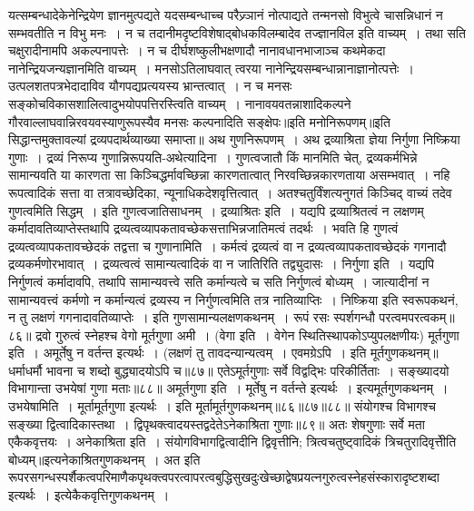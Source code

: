 यत्सम्बन्धादेकेनेन्द्रियेण ज्ञानमुत्पद्यते यदसम्बन्धाच्च परैज्र्ञानं नोत्पाद्यते तन्मनसो विभुत्वे चासन्निधानं न सम्भवतीति न विभु मनः~। न च तदानीमदृष्टविशेषाद्बोधकविलम्बादेव
तज्ज्ञानविल इति वाच्यम्~। तथा सति चक्षुरादीनामपि अकल्पनापत्तेः~। न च दीर्घशष्कुलीभक्षणादौ नानावधानभाजाञ्च कथमेकदा नानेन्द्रियजन्यज्ञानमिति वाच्यम्~।
मनसोऽतिलाघवात् त्वरया नानेन्द्रियसम्बन्धान्नानाज्ञानोत्पत्तेः~। उत्पलशतपत्रभेदादाविव यौगपद्यप्रत्ययस्य भ्रान्तत्वात्~। न च मनसः सङ्कोचविकासशालित्वादुभयोपपत्तिरस्त्विति
वाच्यम्~। नानावयवतन्नाशादिकल्पने गौरवाल्लाघवान्निरवयवस्याणुरूपस्यैव मनसः कल्पनादिति सङ्क्षेपः॥इति मनोनिरूपणम्॥इति सिद्धान्तमुक्तावल्यां द्रव्यपदार्थव्याख्या
समाप्ता॥
अथ गुणनिरूपणम्~।
अथ द्रव्याश्रिता ज्ञेया निर्गुणा निष्क्रिया गुणाः~।
द्रव्यं निरूप्य गुणान्निरूपयति-अथेत्यादिना~। गुणत्वजातौ किं मानमिति चेत्, द्रव्यकर्मभिन्ने सामान्यवति या कारणता सा किञ्चिद्धर्मावच्छिन्ना कारणतात्वात्
निरवच्छिन्नकारणताया असम्भवात्~। नहि रूपत्वादिकं सत्ता वा तत्रावच्छेदिका, न्यूनाधिकदेशवृत्तित्वात्~। अतश्चतुर्विंशत्यनुगतं किञ्चिद् वाच्यं तदेव गुणत्वमिति सिद्धम्~।
इति गुणत्वजातिसाधनम्~।
द्रव्याश्रितः इति~। यद्यपि द्रव्याश्रितत्वं न लक्षणम् कर्मादावतिव्याप्तेस्तथापि द्रव्यत्वव्यापकतावच्छेकसत्ताभिन्नजातिमत्वं तदर्थः~। भवति हि गुणत्वं द्रव्यत्वव्यापकतावच्छेदकं
तद्वत्ता च गुणानामिति~। कर्मत्वं द्रव्यत्वं वा न द्रव्यत्वव्यापकतावच्छेदकं गगनादौ द्रव्यकर्मणोरभावात्~। द्रव्यत्वत्वं सामान्यत्वादिकं वा न जातिरिति तद्व्युदासः~।
निर्गुणा इति~। यद्यपि निर्गुणत्वं कर्मादावपि, तथापि सामान्यवत्त्वे सति कर्मान्यत्वे च सति निर्गुणत्वं बोध्यम्~। जात्यादीनां न सामान्यवत्त्वं कर्मणो न कर्मान्यत्वं
द्रव्यस्य न निर्गुणत्वमिति तत्र नातिव्याप्तिः~।
निष्क्रिया इति स्वरूपकथनं, न तु लक्षणं गगनादावतिव्याप्तेः~।
इति गुणसामान्यलक्षणकथनम्~।
रूपं रसः स्पर्शगन्धौ परत्वमपरत्वकम्॥८६॥
द्रवो गुरुत्वं स्नेहश्च वेगो मूर्तगुणा अमी~।
(वेगा इति~। वेगेन स्थितिस्थापकोऽप्युपलक्षणीयः)
मूर्तगुणा इति~। अमूर्तेषु न वर्तन्त इत्यर्थः~। (लक्षणं तु तावदन्यान्यत्वम्~। एवमग्रेऽपि~।
इति मूर्तगुणकथनम्॥
धर्माधर्मौ भावना च शब्दो बुद्ध्यादयोऽपि च॥८७॥
एतेऽमूर्तगुणाः सर्वे विद्वद्भिः परिकीर्तिताः~।
सङ्ख्यादयो विभागान्ता उभयेषां गुणा मताः॥८८॥
अमूर्तगुणा इति~। मूर्तेषु न वर्तन्ते इत्यर्थः~। इत्यमूर्तगुणकथनम्~।
उभयेषामिति~। मूर्तामूर्तगुणा इत्यर्थः~।
इति मूर्तामूर्तगुणकथनम्॥८६॥८७॥८८॥
संयोगश्च विभागश्च सङ्ख्या द्वित्वादिकास्तथा~।
द्विपृथक्त्वादयस्तद्वदेतेऽनेकाश्रिता गुणाः॥८९॥
अतः शेषगुणाः सर्वे मता एकैकवृत्तयः~।
अनेकाश्रिता इति~। संयोगविभागद्वित्वादीनि द्विवृत्तीनि; त्रित्वचतुष्ट्वादिकं त्रिचतुरादिवृत्तीेति बोध्यम्॥इत्यनेकाश्रितगुणकथनम्~।
अत इति रूपरसगन्धस्पर्शैकत्वपरिमाणैकपृथक्त्वपरत्वापरत्वबुद्धिसुखदुःखेच्छाद्वेषप्रयत्नगुरुत्वस्नेहसंस्कारादृष्टशब्दा इत्यर्थः~। इत्येकैकवृत्तिगुणकथनम्~।
